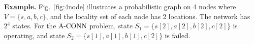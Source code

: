 \nwline
{\bf Example.}
     Fig.~\ref{fig:4node} illustrates a probabilistic graph on 4 nodes
     where $V= \{s, a,b,c\}$, and the locality set of each node has 2
     locations.
     The network has $2^4$ states.
     For the ${\mathrm {A\mbox{-}CONN}}$ problem, 
     state $S_1= \{ s[2], a[2], b[2], c[2] \}$ is operating, and
     state $S_2= \{ s[1], a[1], b[1], c[2] \}$ is failed.
\IEEEQED


